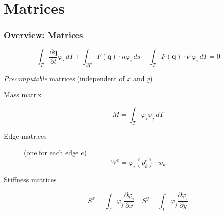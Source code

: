 \documentclass{beamer}
\newcommand{\todo}[1]{
  \textcolor{red}{TODO: #1}
  \note{\textcolor{red}{TODO: #1}}
}
\renewcommand{\todo}[1]{}
\newcommand{\pd}[2]{\dfrac{\partial #1}{\partial #2}}
\renewcommand{\phi}{\varphi}
\begin{document}
\section{Matrices}

  


\begin{frame}
  \frametitle{Overview: Matrices}
  \vspace{-.3cm}
  \begin{equation*}
    \int_T \pd {\mathbf{q}}{t} \phi_i \, dT +
    \int_{\partial T} F(\mathbf{q}) \cdot n \phi_i \, ds -
    \int_T F(\mathbf{q}) \cdot \nabla \phi_i \, dT = 0
  \end{equation*}
  \begin{block}{\emph{Precomputable} matrices (independent of $x$ and $y$)}
    \begin{description}
    \item[Mass matrix]
      \begin{equation}
        \label{eq:mass-matrix-overview}
        M = \int_T \phi_i \phi_j \ dT
      \end{equation}
    \item[Edge matrices] (one for each edge $e$) %
      \begin{equation}
        \label{eq:edge-matrices}
        W^e = \phi_i\left(p_k^e\right) \cdot w_k
      \end{equation}
    \item[Stiffness matrices]
      \begin{equation}
        \label{eq:stiffness-matrix-overview}
        S^x = \int_T \phi_j \pd{\phi_i}{x} \quad
        S^y = \int_T \phi_j \pd{\phi_i}{y}
      \end{equation}
    \end{description}
  \end{block}
\end{frame}
\end{document}

